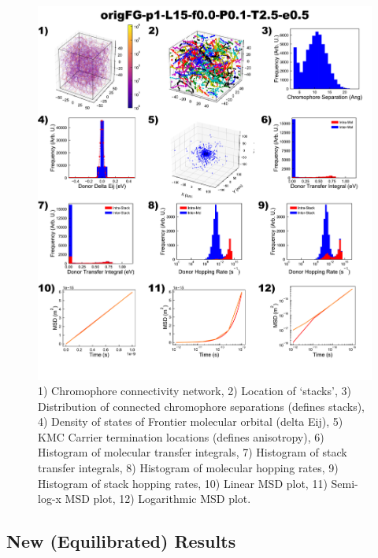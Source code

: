 \documentclass[12pt]{article}
\begin{document}
\begin{figure}[h]\centering
	\includegraphics[width=\textwidth]{Figures/origFG-p1-L15-f0.0-P0.1-T2.5-e0.5.png}
    \caption{   1) Chromophore connectivity network, 
                2) Location of `stacks', 
                3) Distribution of connected chromophore separations (defines stacks),
                4) Density of states of Frontier molecular orbital (delta Eij),
                5) KMC Carrier termination locations (defines anisotropy),
                6) Histogram of molecular transfer integrals,
                7) Histogram of stack transfer integrals,
                8) Histogram of molecular hopping rates,
                9) Histogram of stack hopping rates,
                10) Linear MSD plot,
                11) Semi-log-x MSD plot,
                12) Logarithmic MSD plot.}
	\label{fig:UneqlT2.5}
\end{figure}


\clearpage

\subsection{New (Equilibrated) Results}
\end{document}
